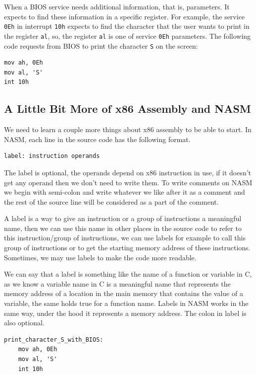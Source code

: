 When a BIOS service needs additional information, that is, parameters.
It expects to find these information in a specific register. For
example, the service \lstinline!0Eh! in interrupt \lstinline!10h!
expects to find the character that the user wants to print in the
register \lstinline!al!, so, the register \lstinline!al! is one of
service \lstinline!0Eh! parameters. The following code requests from
BIOS to print the character \lstinline!S! on the screen:

\begin{lstlisting}
mov ah, 0Eh
mov al, 'S'
int 10h
\end{lstlisting}

\subsection{A Little Bit More of x86 Assembly and
NASM}\label{a-little-bit-more-of-x86-assembly-and-nasm}

We need to learn a couple more things about x86 assembly to be able to
start. In NASM, each line in the source code has the following format.

\begin{lstlisting}
label: instruction operands
\end{lstlisting}

The label is optional, the operands depend on x86 instruction in use, if
it doesn't get any operand then we don't need to write them. To write
comments on NASM we begin with semi-colon and write whatever we like
after it as a comment and the rest of the source line will be considered
as a part of the comment.

A label is a way to give an instruction or a group of instructions a
meaningful name, then we can use this name in other places in the source
code to refer to this instruction/group of instructions, we can use
labels for example to call this group of instructions or to get the
starting memory address of these instructions. Sometimes, we may use
labels to make the code more readable.

We can say that a label is something like the name of a function or
variable in C, as we know a variable name in C is a meaningful name that
represents the memory address of a location in the main memory that
contains the value of a variable, the same holds true for a function
name. Labels in NASM works in the same way, under the hood it represents
a memory address. The colon in label is also optional.

\begin{lstlisting}
print_character_S_with_BIOS:
    mov ah, 0Eh
    mov al, 'S'
    int 10h
\end{lstlisting}


